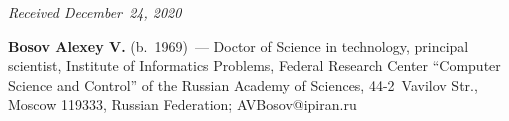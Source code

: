\vspace*{-3pt}

  \hfill{\small\textit{Received December~24, 2020}}



      
      \Contrl
      
      \noindent
      \textbf{Bosov Alexey V.} (b.\ 1969)~--- Doctor of Science in technology, principal scientist, 
Institute of Informatics Problems, Federal Research Center ``Computer Science and Control'' of the 
Russian Academy of Sciences, 44-2~Vavilov Str., Moscow 119333, Russian Federation; 
\mbox{AVBosov@ipiran.ru}
      
      
\label{end\stat}

\renewcommand{\bibname}{\protect\rm Литература}